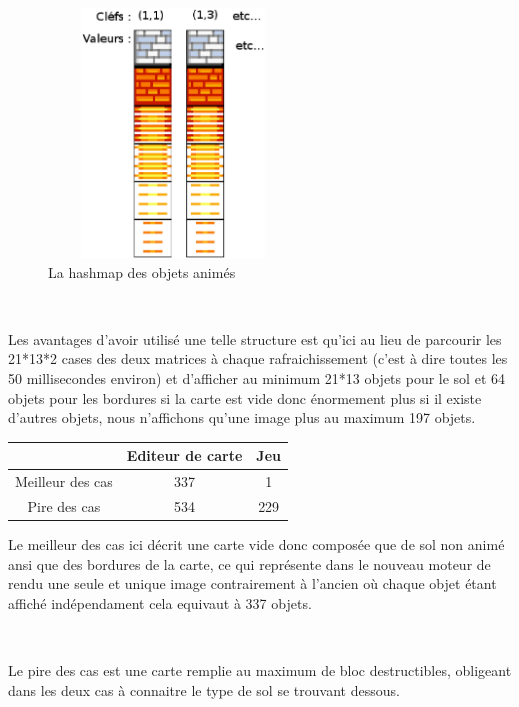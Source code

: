 			\begin{figure}[!h]			
				\begin{center}						
					\includegraphics[width=250px, height=250px]{Developpement/Img/hashmap.eps}
					\caption{La hashmap des objets animés}
				\end{center}
			\end{figure}

			$\,$
			
			\newpage

			Les avantages d'avoir utilisé une telle structure est qu'ici au lieu de
			parcourir les 21*13*2 cases des deux matrices à chaque rafraichissement
			(c'est à dire toutes les 50 millisecondes environ) et d'afficher au minimum
			21*13 objets pour le sol et 64 objets pour les bordures si la carte est vide
			donc énormement plus si il existe d'autres objets, nous n'affichons qu'une
			image plus au maximum 197 objets.
			
			\begin{center}
				\begin{tabular}{|c|c|c|} \hline
				  & Editeur de carte & Jeu    \\\hline 
				Meilleur des cas & 337 & 1    \\\hline
				Pire des cas     & 534 & 229  \\\hline		
				\end{tabular}
			\end{center}
			
			Le meilleur des cas ici décrit une carte vide donc composée que de sol non
			animé ansi que des bordures de la carte, ce qui représente dans le nouveau
			moteur de rendu une seule et unique image contrairement à l'ancien où chaque
			objet étant affiché indépendament cela equivaut à 337 objets.
			
			$\,$
			
			Le pire des cas est une carte remplie au maximum de bloc destructibles,
			obligeant dans les deux cas à connaitre le type de sol se trouvant dessous.
			
